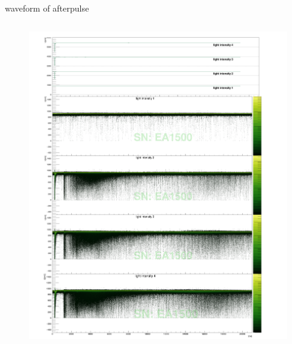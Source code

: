 \documentclass[11pt,compress,xcolor=x11names,UTF8]{beamer}
\begin{document}
\begin{frame}{waveform of afterpulse}
\begin{columns}
\begin{column}{.485\textwidth}
\begin{figure}
\includegraphics[width=1.049\textwidth]{figure/EA1500_avewave.png} %
\end{figure}
\end{column}
\end{columns}
\end{frame}
\end{document}
